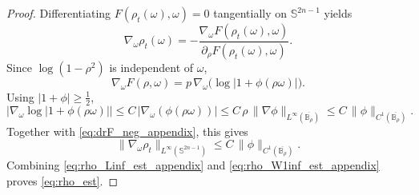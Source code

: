 \documentclass[10pt,a4paper]{amsart}
\newcommand{\B}{\mathbb{B}}
\newcommand{\Sn}{\mathbb{S}^{2n-1}}
\begin{document}
\begin{proof}
Differentiating \(F(\rho_t(\omega),\omega)=0\) tangentially on \(\Sn\) yields
\[
\nabla_\omega \rho_t(\omega)
=
-\frac{\nabla_\omega F(\rho_t(\omega),\omega)}{\partial_\rho F(\rho_t(\omega),\omega)}.
\]
Since \(\log(1-\rho^2)\) is independent of \(\omega\),
\[
\nabla_\omega F(\rho,\omega)
=
p\,\nabla_\omega\bigl(\log|1+\phi(\rho\omega)|\bigr).
\]
Using \(|1+\phi|\ge \frac12\),
\[
\bigl|\nabla_\omega\log|1+\phi(\rho\omega)|\bigr|
\le
C\,|\nabla_\omega(\phi(\rho\omega))|
\le
C\,\rho\,\|\nabla\phi\|_{L^\infty(\overline{\B_\rho})}
\le
C\,\|\phi\|_{C^1(\overline{\B_\rho})}.
\]
Together with \eqref{eq:drF_neg_appendix}, this gives
\begin{equation}\label{eq:rho_W1inf_est_appendix}
\|\nabla_\omega \rho_t\|_{L^\infty(\Sn)}
\le
C\,\|\phi\|_{C^1(\overline{\B_\rho})}.
\end{equation}
Combining \eqref{eq:rho_Linf_est_appendix} and \eqref{eq:rho_W1inf_est_appendix} proves \eqref{eq:rho_est}.
\end{proof}
\end{document}

